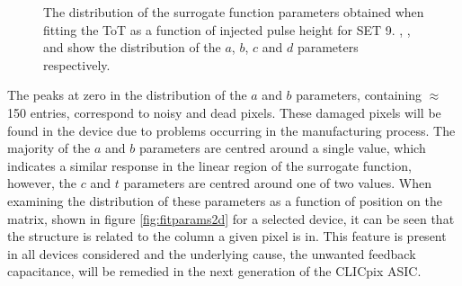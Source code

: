 \begin{figure}[h!]
\caption[The distribution of the surrogate function parameters obtained when fitting the ToT as a function of injected pulse height for SET 9.  \protect{}, \protect{}, \protect{} and \protect{} show the distribution of the $a$, $b$, $c$ and $d$ parameters respectively.]{The distribution of the surrogate function parameters obtained when fitting the ToT as a function of injected pulse height for SET 9.  \protect{}, \protect{}, \protect{} and \protect{} show the distribution of the $a$, $b$, $c$ and $d$ parameters respectively.}  
\label{fig:fitparams}
\end{figure}

The peaks at zero in the distribution of the $a$ and $b$ parameters, containing $\approx$ 150 entries, correspond to noisy and dead pixels.  These damaged pixels will be found in the device due to problems occurring in the manufacturing process.  The majority of the $a$ and $b$ parameters are centred around a single value, which indicates a similar response in the linear region of the surrogate function, however, the $c$ and $t$ parameters are centred around one of two values.  When examining the distribution of these parameters as a function of position on the matrix, shown in figure \ref{fig:fitparams2d} for a selected device, it can be seen that the structure is related to the column a given pixel is in.  This feature is present in all devices considered and the underlying cause, the unwanted feedback capacitance, will be remedied in the next generation of the CLICpix ASIC.

